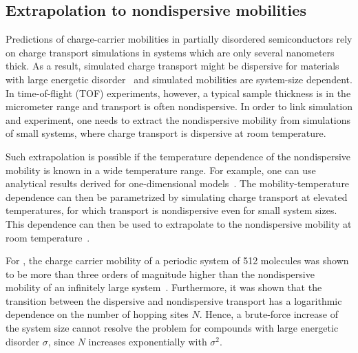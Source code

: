 \subsection{Extrapolation to nondispersive mobilities}
\label{sec:nondispersive}
Predictions of charge-carrier mobilities in partially disordered semiconductors  rely on charge transport simulations in systems which are only several nanometers thick. As a result, simulated charge transport might be dispersive for materials with large energetic disorder~\cite{scher_anomalous_1975,borsenberger_role_1993} and simulated mobilities are system-size dependent. In time-of-flight (TOF) experiments, however, a typical sample thickness is in the micrometer range and transport is often nondispersive. In order to link simulation and experiment, one needs to extract the nondispersive mobility from simulations of small systems, where charge transport is dispersive at room temperature.

Such extrapolation is possible if the temperature dependence of the nondispersive mobility is known in a wide temperature range. For example, one can use analytical results derived for one-dimensional models~\cite{derrida_velocity_1983,cordes_one-dimensional_2001,seki_electric_2001}. The mobility-temperature dependence can then be parametrized by simulating charge transport at elevated temperatures, for which transport is nondispersive even for small system sizes. This dependence can then be used to extrapolate to the nondispersive mobility at room temperature~\cite{lukyanov_extracting_2010}.

For \Alq, the charge carrier mobility of a periodic system of 512 molecules was shown to be more than three orders of magnitude higher than the nondispersive mobility of an infinitely large system~\cite{lukyanov_extracting_2010}. Furthermore, it was shown that the transition between the dispersive and nondispersive transport has a logarithmic dependence on the number of hopping sites $N$. Hence, a brute-force increase of the system size cannot resolve the problem for compounds with large energetic disorder $\sigma$, since $N$ increases exponentially with $\sigma^2$.
 

